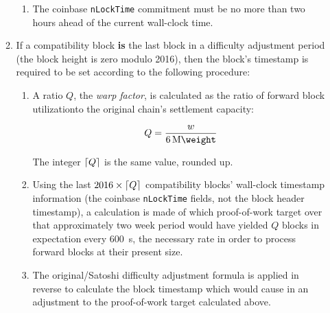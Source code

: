 \begin{enumerate}
\begin{enumerate}
\begin{enumerate}
      \item
        The coinbase {\tt nLockTime} commitment must be no more than
        two hours ahead of the current wall-clock time.
    \end{enumerate}


  \item

    If a compatibility block \textbf{is} the last block in a
    difficulty adjustment period (the block height is zero
    modulo \num{2016}), then the block's timestamp is required to be
    set according to the following procedure:

    \begin{enumerate}
      \item

        A ratio $Q$, the \emph{warp factor}, is calculated as the
        ratio of forward block utilization\footnotemark to the
        original chain's settlement capacity:

        \begin{equation}
          Q = \frac{w}{\SI{6}{\mega\weight}}
        \end{equation}


        The integer $\lceil Q\rceil$ is the same value, rounded up.

      \item

        Using the last $2016 \times \lceil Q\rceil$ compatibility blocks'
        wall-clock timestamp information (the coinbase {\tt nLockTime}
        fields, not the block header timestamp), a calculation is made
        of which proof-of-work target over that approximately two week
        period would have yielded $Q$ blocks in expectation
        every \SI{600}{\second}, the necessary rate in order to
        process forward blocks at their present size.

      \item

        The original/Satoshi difficulty adjustment formula is applied
        in reverse to calculate the block timestamp which would cause
        in an adjustment to the proof-of-work target calculated above.


\end{enumerate}
\end{enumerate}
\end{enumerate}
